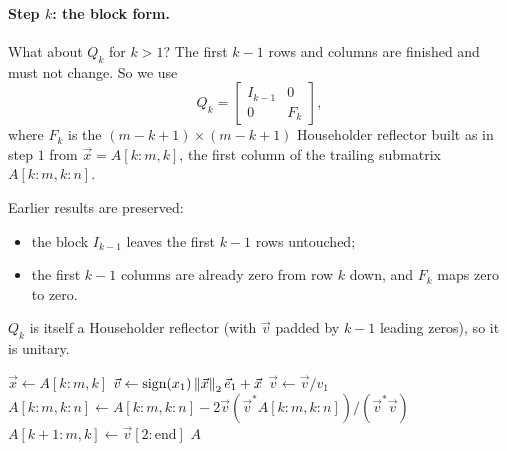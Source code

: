 \paragraph{Step $k$: the block form.} What about $Q_k$ for $k > 1$? The first $k - 1$ rows and columns are finished and must not change. So we use
\begin{equation}
  Q_k = \begin{bmatrix} I_{k-1} & 0 \\ 0 & F_k \end{bmatrix},
\end{equation}
where $F_k$ is the $(m - k + 1) \times (m - k + 1)$ Householder reflector built as in step $1$ from $\vec{x} = A[k{:}m, k]$, the first column of the trailing submatrix $A[k{:}m, k{:}n]$.

Earlier results are preserved:
\begin{itemize}
  \item the block $I_{k-1}$ leaves the first $k - 1$ rows untouched;
  \item the first $k - 1$ columns are already zero from row $k$ down, and $F_k$ maps zero to zero.
\end{itemize}
$Q_k$ is itself a Householder reflector (with $\vec{v}$ padded by $k - 1$ leading zeros), so it is unitary.

\begin{algorithm}[H]
  \caption{Householder QR, in place.}
  \label{alg:householder}
  \begin{algorithmic}[1]
      \State $\vec{x} \gets A[k{:}m, k]$
      \State $\vec{v} \gets \operatorname{sign}(x_1)\left\lVert \vec{x} \right\rVert_2\vec{e}_1 + \vec{x}$ 
      \State $\vec{v} \gets \vec{v}/v_1$ 
      \State $A[k{:}m, k{:}n] \gets A[k{:}m, k{:}n] - 2\vec{v}\left(\vec{v}^\ast A[k{:}m, k{:}n]\right)/(\vec{v}^\ast\vec{v})$
      \State $A[k{+}1{:}m, k] \gets \vec{v}[2{:}\mathrm{end}]$ 
    \EndFor
    \State \Return $A$ 
  \end{algorithmic}
\end{algorithm}

